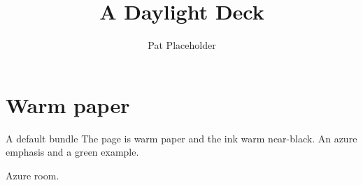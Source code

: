 \documentclass[aspectratio=169]{beamer}
\title{A Daylight Deck}
\author{Pat Placeholder}
\begin{document}
\maketitle

\section{Warm paper}

\begin{frame}{A default bundle}
  The page is warm paper and the ink warm near-black.
  An \alert{azure emphasis} and a \textcolor{example}{green example}.
\end{frame}

\begin{frame}[standout]
  Azure room.
\end{frame}
\end{document}
